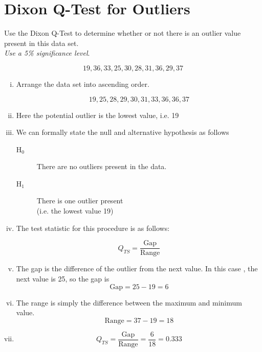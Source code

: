 \documentclass[]{article}
\title{}
\author{}
\begin{document}
\LARGE
\section*{Dixon Q-Test for Outliers}

Use the Dixon Q-Test to determine whether or not there is an outlier value present in this data set.
\\ \textit{Use a 5\% significance level}.


{
\Huge
\begin{framed}
\[19, 36,33,  25, 30, 28, 31,36, 29, 37\]
\end{framed}
}



\newpage
\begin{enumerate}[(i)]
\item Arrange the data set into ascending order.
\begin{framed}
\[19, 25, 28, 29, 30, 31, 33, 36, 36, 37\]
\end{framed}
\item Here the potential outlier is the lowest value, i.e. 19

\newpage
\item We can formally state the null and alternative hypothesis as follows

\begin{framed}
\begin{description}
\item[H$_0$] There are no outliers present in the data.
\item[H$_1$] There is one outlier present \\ (i.e. the lowest value 19)
\end{description}
\end{framed}
\newpage


\item The test statistic for this procedure is as follows:

\[ Q_{TS} =  \frac{\mbox{Gap}}{\mbox{Range}} \]

\item The gap is the difference of the outlier from the next value. In this case , the next value is 25, so the gap is 
\[ \mbox{Gap} = 25 - 19 = 6\]
\item The range is simply the difference between the maximum and minimum value.
\[ \mbox{Range} = 37-19 =18\]

\item \[ Q_{TS} =  \frac{\mbox{Gap}}{\mbox{Range}} = \frac{6}{18} =0.333 \]


\end{enumerate}
\end{document}
